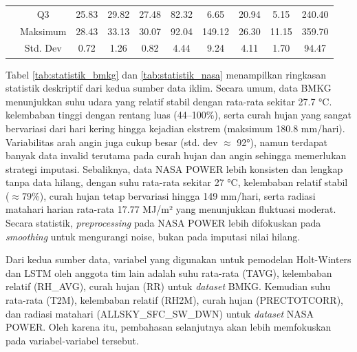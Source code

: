 \begin{enumerate}[(a)]
\begin{table}[H]
\begin{adjustbox}{max width=\textwidth}
\begin{tabular}{|l|c|c|c|c|c|c|c|c|c|}
            \cline{2-10}
            & Q3 & 25.83 & 29.82 & 27.48 & 82.32 & 6.65 & 20.94 & 5.15 & 240.40 \\
            \cline{2-10}
            & Maksimum & 28.43 & 33.13 & 30.07 & 92.04 & 149.12 & 26.30 & 11.15 & 359.70 \\
            \cline{2-10}
            & Std. Dev & 0.72 & 1.26 & 0.82 & 4.44 & 9.24 & 4.11 & 1.70 & 94.47 \\
            \hline
            \end{tabular}
            \end{adjustbox}
        \end{table}
        \end{enumerate}
        Tabel \ref{tab:statistik_bmkg} dan \ref{tab:statistik_nasa} menampilkan ringkasan statistik deskriptif dari kedua sumber data iklim. Secara umum, data BMKG menunjukkan suhu udara yang relatif stabil dengan rata-rata sekitar 27.7 °C. kelembaban tinggi dengan rentang luas (44–100\%), serta curah hujan yang sangat bervariasi dari hari kering hingga kejadian ekstrem (maksimum 180.8 mm/hari). Variabilitas arah angin juga cukup besar (std. dev $\approx$ 92°), namun terdapat banyak data invalid terutama pada curah hujan dan angin sehingga memerlukan strategi imputasi. Sebaliknya, data NASA POWER lebih konsisten dan lengkap tanpa data hilang, dengan suhu rata-rata sekitar 27 °C, kelembaban relatif stabil ($\approx$79\%), curah hujan tetap bervariasi hingga 149 mm/hari, serta radiasi matahari harian rata-rata 17.77 MJ/m² yang menunjukkan fluktuasi moderat. Secara statistik, \textit{preprocessing} pada NASA POWER lebih difokuskan pada \textit{smoothing} untuk mengurangi noise, bukan pada imputasi nilai hilang.

        Dari kedua sumber data, variabel yang digunakan untuk pemodelan Holt-Winters dan LSTM oleh anggota tim lain adalah suhu rata-rata (TAVG), kelembaban relatif (RH\_AVG), curah hujan (RR) untuk \textit{dataset} BMKG. Kemudian suhu rata-rata (T2M), kelembaban relatif (RH2M), curah hujan (PRECTOTCORR), dan radiasi matahari (ALLSKY\_SFC\_SW\_DWN) untuk \textit{dataset} NASA POWER. Oleh karena itu, pembahasan selanjutnya akan lebih memfokuskan pada variabel-variabel tersebut.

